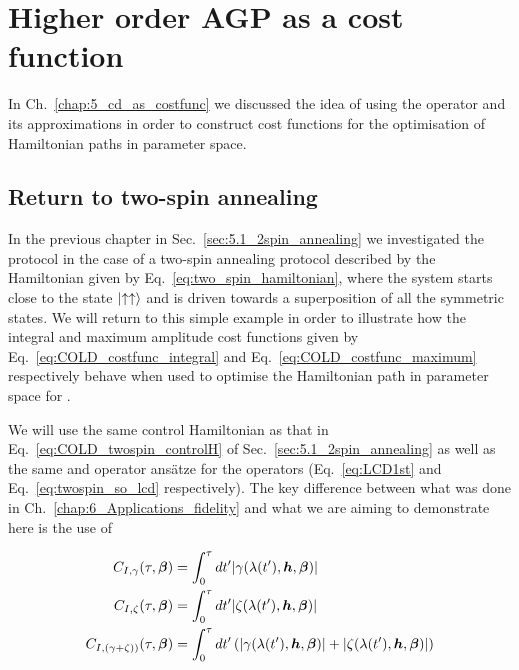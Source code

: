 \chapter{Higher order AGP as a cost function}\label{chap:7_higher_order_agp}

In Ch.~\ref{chap:5_cd_as_costfunc} we discussed the idea of using the  operator and its approximations in order to construct cost functions for the optimisation of Hamiltonian paths in parameter space. 

\section{Return to two-spin annealing}

In the previous chapter in Sec.~\ref{sec:5.1_2spin_annealing} we investigated the  protocol in the case of a two-spin annealing protocol described by the Hamiltonian given by Eq.~\eqref{eq:two_spin_hamiltonian}, where the system starts close to the state $\ket{\uparrow\uparrow}$ and is driven towards a superposition of all the symmetric states. We will return to this simple example in order to illustrate how the integral and maximum amplitude cost functions given by Eq.~\eqref{eq:COLD_costfunc_integral} and Eq.~\eqref{eq:COLD_costfunc_maximum} respectively behave when used to optimise the Hamiltonian path in parameter space for . 

We will use the same control Hamiltonian as that in Eq.~\eqref{eq:COLD_twospin_controlH} of Sec.~\ref{sec:5.1_2spin_annealing} as well as the same  and  operator ans\"{a}tze for the  operators (Eq.~\eqref{eq:LCD1st} and Eq.~\eqref{eq:twospin_so_lcd} respectively). The key difference between what was done in Ch.~\ref{chap:6_Applications_fidelity} and what we are aiming to demonstrate here is the use of 
 
\begin{equation}\label{eq:twospin_costfunc_int}
    \begin{aligned}
        C_{I, \gamma}(\tau, \boldsymbol{\beta}) &= \int_{0}^{\tau} dt^{\prime} |\gamma(\lambda(t^{\prime}), \boldsymbol{h}, \boldsymbol{\beta})|\\
        C_{I, \zeta}(\tau, \boldsymbol{\beta}) &= \int_{0}^{\tau} dt^{\prime} |\zeta(\lambda(t^{\prime}), \boldsymbol{h}, \boldsymbol{\beta})|\\
        C_{I, (\gamma + \zeta))}(\tau, \boldsymbol{\beta}) &= \int_{0}^{\tau} dt^{\prime} \left(|\gamma(\lambda(t^{\prime}), \boldsymbol{h}, \boldsymbol{\beta})| + |\zeta(\lambda(t^{\prime}), \boldsymbol{h}, \boldsymbol{\beta})|\right)
    \end{aligned}
\end{equation}

